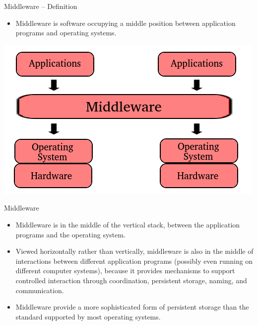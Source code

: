 \documentclass[compress,11pt,xcolor=svgnames,aspectratio=169]{beamer}
\begin{document}
\begin{frame}[fragile]{Middleware -- Definition}

\begin{itemize}
\setlength\itemsep{0.6cm}

  \item Middleware is software occupying a middle position between application programs and operating systems.

\end{itemize}

\begin{center}
\includegraphics[scale=0.5]{fig/middleware2}
\end{center}

\nocite{hailperin2006operating}

\end{frame}

\begin{frame}[fragile]{Middleware}

\begin{itemize}
\setlength\itemsep{0.6cm}

  \item Middleware is in the middle of the vertical stack, between the application programs and the operating system.

  \item Viewed horizontally rather than vertically, middleware is also in the middle of interactions between different application programs (possibly even running on different computer systems), because it provides mechanisms to support controlled interaction through coordination, persistent storage, naming, and communication.

  \item Middleware provide a more sophisticated form of persistent storage than the standard supported by most operating systems.

\end{itemize}

\nocite{hailperin2006operating}

\end{frame}
\end{document}

